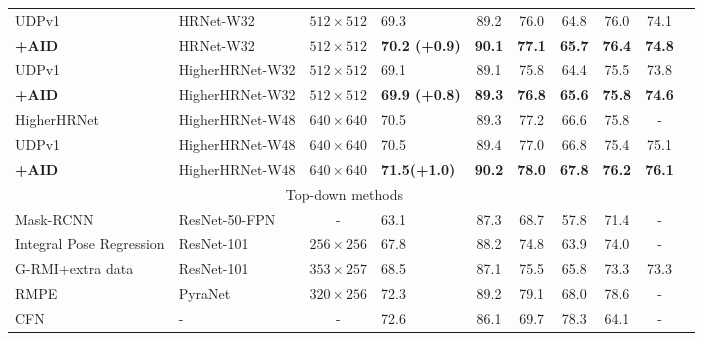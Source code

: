 \documentclass[final]{cvpr}
\begin{document}
\begin{table*}
\begin{center}
\begin{tabular}{l|l|c|lcccccc}
UDPv1 \cite{UDP}                   & HRNet-W32     &$512\times512$    &69.3                  & 89.2              & 76.0         & 64.8          &76.0           &74.1\\
\textbf{+AID}                     & HRNet-W32     &$512\times512$    &\textbf{70.2 (+0.9)}   &\textbf{90.1}      &\textbf{77.1} &\textbf{65.7}  &\textbf{76.4}  &\textbf{74.8}\\
UDPv1 \cite{UDP}                   &HigherHRNet-W32&$512\times512$    &69.1                  & 89.1              & 75.8         & 64.4          &75.5           &73.8\\
\textbf{+AID}                     &HigherHRNet-W32&$512\times512$    &\textbf{69.9 (+0.8)}   &\textbf{89.3}      &\textbf{76.8} &\textbf{65.6}  &\textbf{75.8}  &\textbf{74.6}\\
HigherHRNet \cite{Higher}          &HigherHRNet-W48&$640\times640$    &70.5                  & 89.3              & 77.2         & 66.6          &75.8           &-\\
UDPv1\cite{UDP}                   &HigherHRNet-W48&$640\times640$    &70.5                  & 89.4              & 77.0         & 66.8          &75.4           &75.1\\
\textbf{+AID}                     &HigherHRNet-W48&$640\times640$    &\textbf{71.5(+1.0)}   &\textbf{90.2}      &\textbf{78.0} &\textbf{67.8}  &\textbf{76.2}  &\textbf{76.1}\\
\hline
\multicolumn{9}{c}{Top-down methods}\\
\hline
Mask-RCNN \cite{Mask-RCNN}        & ResNet-50-FPN  &-                &63.1                  & 87.3             & 68.7          & 57.8          &71.4           &-   \\
Integral Pose Regression \cite{IPR}& ResNet-101    &$256\times 256$  &67.8                  & 88.2             & 74.8          & 63.9          &74.0           &-   \\
G-RMI+extra data \cite{G-RMI}     & ResNet-101       &$353\times 257$&68.5                  & 87.1             & 75.5          & 65.8          &73.3           &73.3\\
RMPE \cite{RMPE}             & PyraNet\cite{PyraNet}&$320\times 256$ &72.3                  & 89.2             & 79.1          & 68.0          &78.6           &-   \\
CFN \cite{CFN}                    & -                &-              &72.6                  & 86.1             & 69.7          & 78.3          &64.1           &-   \\

\end{tabular}
\end{center}
\end{table*}
\end{document}
